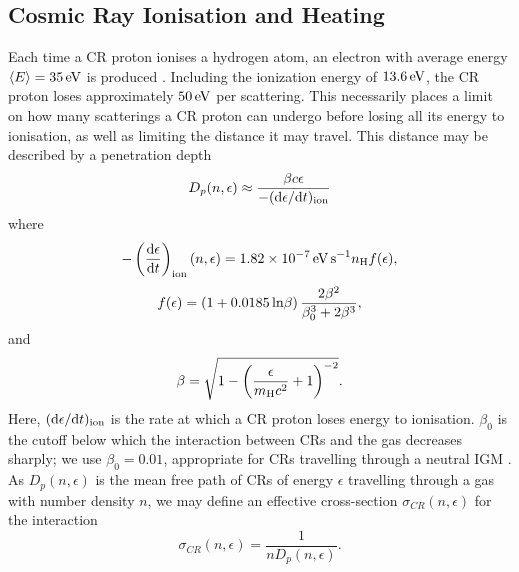 \documentclass[usenatbib]{mn2e}
\newcommand{\ev}{\,{\rm eV}}
\newcommand{\h}{\mathrm{H}}
\begin{document}
\subsection{Cosmic Ray Ionisation and Heating}
\label{CRchem}

Each time a CR proton ionises a hydrogen atom, an electron with average energy $\langle E \rangle = 35\ev$ is produced \citep{SpitzerTomasko1968}.  
Including the ionization energy of $13.6\ev$, the CR proton loses approximately $50\ev$ per scattering. 
This necessarily places a limit on how many scatterings a CR proton can undergo before losing all its energy to ionisation, as well as limiting the distance it may travel.  
This distance may be described by a penetration depth 
\begin{equation}
    D_p(n, \epsilon) \approx \frac{\beta c \epsilon} {-({\rm d}\epsilon / {\rm d}t)_{\rm ion}}
\end{equation}
where \citep{Schlickeiser2002}
\begin{equation}
    - \left( \frac{{\rm d}\epsilon} {{\rm d}t} \right)_{\rm ion}(n, \epsilon)
    = 1.82\times10^{-7}\,{\rm \small eV\,s}^{-1} n_{\h} f(\epsilon),
\end{equation}
\begin{equation}    
    f(\epsilon) = (1 + 0.0185 \,{\rm ln}\beta )\, \frac{2 \beta^2}{\beta_0^3 + 2 \beta^3},
\end{equation}
and 
\begin{equation}
    \beta =  \sqrt{1 - \left( \frac{\epsilon}{m_{\rm \tiny H}c^2}+1 \right)^{-2}}.
\end{equation}
Here, $({\rm d}\epsilon / {\rm d}t)_{\rm ion}$ is the rate at which a CR proton loses energy to ionisation. 
$\beta_0$ is the cutoff below which the interaction between CRs and the gas decreases sharply; we use $\beta_0=0.01$, appropriate for CRs travelling through a neutral IGM \citep{StacyBromm2007}.
As $D_p(n, \epsilon)$ is the mean free path of CRs of energy $\epsilon$ travelling through a gas with number density $n$, we may define an effective cross-section $\sigma_{CR}(n,\epsilon)$ for the interaction
\begin{equation}
\sigma_{CR}(n,\epsilon) = \frac{1}{n D_p(n, \epsilon)}.
\end{equation}
\end{document}
